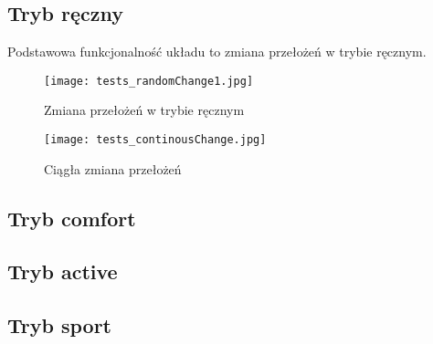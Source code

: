 \subsection{Tryb ręczny}
Podstawowa funkcjonalność układu to zmiana przełożeń w trybie ręcznym. 
\begin{figure}[h]
    \centering
    \texttt{[image: tests\_randomChange1.jpg]}
    \caption{Zmiana przełożeń w trybie ręcznym}
    \label{fig:tests_randomChange}
\end{figure}

\begin{figure}[h]
    \centering
    \texttt{[image: tests\_continousChange.jpg]}
    \caption{Ciągła zmiana przełożeń}
    \label{fig:tests_continousChange}
\end{figure}
\subsection{Tryb comfort}

\subsection{Tryb active}

\subsection{Tryb sport}
